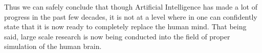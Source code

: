 Thus we can safely conclude that though Artificial Intelligence has made a lot of progress in the past few decades, it is not at a level where in one can confidently state that it is now ready to completely replace the human mind. That being said, large scale research is now being conducted into the field of proper simulation of the human brain.
